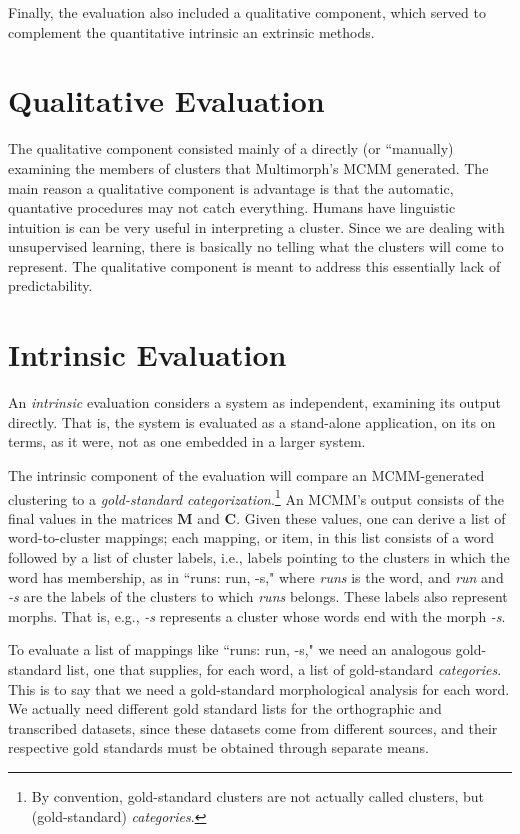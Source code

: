 Finally, the evaluation also included a qualitative component, which served to complement the quantitative 
 intrinsic an extrinsic methods.


\section{Qualitative Evaluation}
The qualitative component consisted mainly of a directly (or ``manually) examining the members of clusters that Multimorph's MCMM generated. 
The main reason a qualitative component is advantage is that the automatic, quantative procedures may not catch everything. Humans have linguistic intuition is can be very useful in interpreting a cluster. Since we are dealing with unsupervised learning, there is basically no telling what the clusters will come to represent. The qualitative component is meant to address this essentially lack of predictability.

\section{Intrinsic Evaluation}
An \emph{intrinsic} evaluation considers a system as independent, examining its 
output directly. That is, the system is evaluated as a stand-alone application, on its
on terms, as it were,
not as one embedded in a larger system.

The intrinsic component of the evaluation will compare an MCMM-generated clustering to a 
\emph{gold-standard categorization}.\footnote{By convention, 
gold-standard clusters are not actually called clusters, 
but (gold-standard) \emph{categories}.} 
An MCMM's output consists of 
the final values in the matrices $\mathbf{M}$ and $\mathbf{C}$.
Given these values, one can derive a list of word-to-cluster mappings; 
each mapping, or item, in this list
consists of a word followed by a list of cluster labels, i.e., labels pointing to
the clusters in which the word has membership, 
as in ``runs: run, -s,"  where \textit{runs} is the word, and \textit{run} and \textit{-s} 
are the labels of the clusters to which \textit{runs} belongs. These labels also represent 
morphs. That is, e.g., \emph{-s} represents a cluster whose words end with the morph 
\emph{-s}.

To evaluate a list of mappings like ``runs: run, -s," we need an analogous 
gold-standard list, one that supplies, for each word, a list of gold-standard \emph{categories}.
This is to say that we need a gold-standard morphological analysis for each word. 
We actually need different gold standard lists for the orthographic and transcribed datasets, 
since these datasets come from different sources, and their respective gold standards must 
be obtained through separate means.


